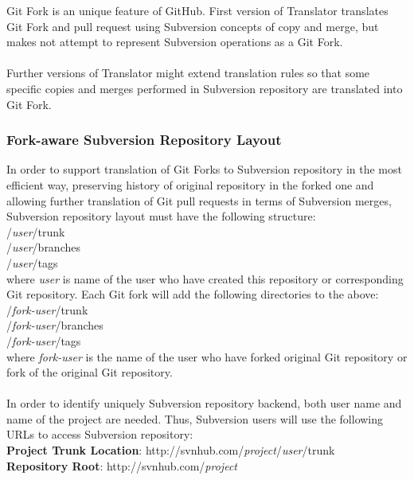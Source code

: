 Git Fork is an unique feature of GitHub. First version of Translator translates Git Fork and pull request using Subversion concepts of copy and merge,
but makes not attempt to represent Subversion operations as a Git Fork.\\\\
Further versions of Translator might extend translation
rules so that some specific copies and merges performed in Subversion repository are translated into Git Fork.

\subsubsection{Fork-aware Subversion Repository Layout}

In order to support translation of Git Forks to Subversion repository in the most efficient way, 
preserving history of original repository in the forked one and allowing further translation of
Git pull requests in terms of Subversion merges, 
Subversion repository layout must have the following structure:\\

/\emph{user}/trunk\\
/\emph{user}/branches\\
/\emph{user}/tags\\

where \emph{user} is name of the user who have created this repository or 
corresponding Git repository. Each Git fork will add the following directories to the above:\\

/\emph{fork-user}/trunk\\
/\emph{fork-user}/branches\\
/\emph{fork-user}/tags\\

where \emph{fork-user} is the name of the user who have forked original Git repository or fork of the original Git repository.
\\\\
In order to identify uniquely Subversion repository backend, both user name and name of the project are needed. Thus,
Subversion users will use the following URLs to access Subversion repository:\\

\textbf{Project Trunk Location}: http://svnhub.com/\emph{project}/\emph{user}/trunk\\
\textbf{Repository Root}: http://svnhub.com/\emph{project}\\

